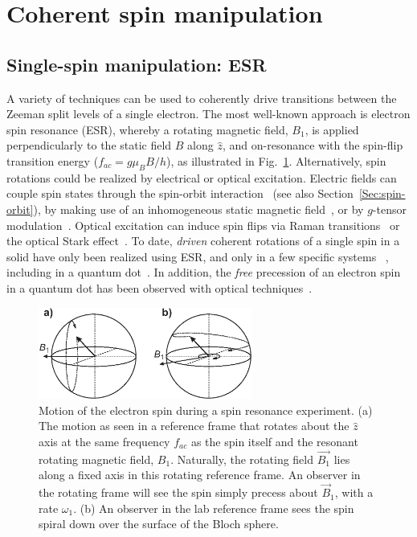 \documentclass[rmp,twocolumn,aps]{revtex4}
\begin{document}
\section{Coherent spin manipulation}
\label{Section:Coherent}

\subsection{Single-spin manipulation: ESR}
\label{Sec:esr} A variety of techniques can be used to
coherently drive transitions between the Zeeman split levels of a
single electron. The most well-known approach is electron spin
resonance (ESR), whereby a rotating magnetic field, $B_{1}$, is
applied perpendicularly to the static field $B$ along $\hat{z}$,
and on-resonance with the spin-flip transition energy ($f_{ac}=g
\mu_B B / h$), as illustrated in
Fig.~\ref{fig:nutation}\cite{poole}. Alternatively, spin rotations
could be realized by electrical or optical excitation.
Electric fields can couple spin states through the spin-orbit
interaction~\cite{DobrowolskaPRL1982,kato03a,debald05,schulte05,golovach06} (see also
Section~\ref{Sec:spin-orbit}), by making use of an inhomogeneous
static magnetic field~\cite{tokura06}, or by $g$-tensor
modulation~\cite{kato03b}. Optical excitation can induce spin
flips via Raman transitions~\cite{imamoglu99} or the optical Stark effect~\cite{gupta01}. To date,
\emph{driven} coherent rotations of a single spin in a solid have
only been realized using ESR, and only in a few specific systems ~\cite{xiao04,rugar04,jelezko04,hansonprb2006}, including in a quantum
dot~\cite{koppens06}. In addition, the \emph{free} precession of
an electron spin in a quantum dot has been observed with optical
techniques~\cite{dutt05,greilich06a}.

\begin{figure}[htb]
\includegraphics[width=7cm]{hanson_fig41.eps}
\caption{Motion of the electron spin during a spin resonance
experiment. (a) The motion as seen in a reference frame that
rotates about the $\hat{z}$ axis at the same frequency $f_{ac}$ as
the spin itself and the resonant rotating magnetic field, $B_1$.
Naturally, the rotating field $\vec{B_1}$ lies along a fixed axis
in this rotating reference frame. An observer in the rotating
frame will see the spin simply precess about $\vec{B}_1$, with a
rate $\omega_1$. (b) An observer in the lab reference frame sees
the spin spiral down over the surface of the Bloch sphere.}
\label{fig:nutation}
\end{figure}
\end{document}
